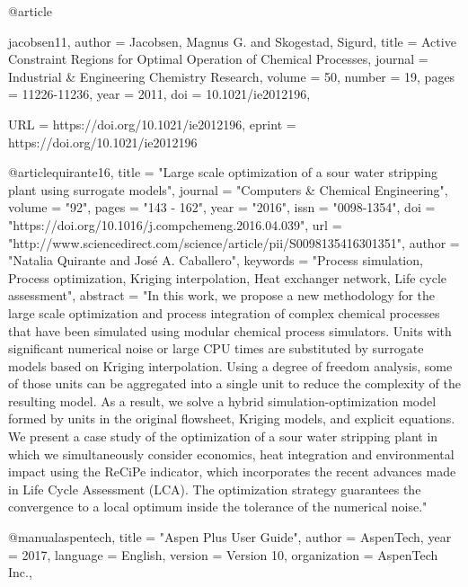 @article{jacobsen11,
author = {Jacobsen, Magnus G. and Skogestad, Sigurd},
title = {Active Constraint Regions for Optimal Operation of Chemical Processes},
journal = {Industrial \& Engineering Chemistry Research},
volume = {50},
number = {19},
pages = {11226-11236},
year = {2011},
doi = {10.1021/ie2012196},

URL = {https://doi.org/10.1021/ie2012196},
eprint = {https://doi.org/10.1021/ie2012196}
}


@article{quirante16,
title = "Large scale optimization of a sour water stripping plant using surrogate models",
journal = "Computers \& Chemical Engineering",
volume = "92",
pages = "143 - 162",
year = "2016",
issn = "0098-1354",
doi = "https://doi.org/10.1016/j.compchemeng.2016.04.039",
url = "http://www.sciencedirect.com/science/article/pii/S0098135416301351",
author = "Natalia Quirante and José A. Caballero",
keywords = "Process simulation, Process optimization, Kriging interpolation, Heat exchanger network, Life cycle assessment",
abstract = "In this work, we propose a new methodology for the large scale optimization and process integration of complex chemical processes that have been simulated using modular chemical process simulators. Units with significant numerical noise or large CPU times are substituted by surrogate models based on Kriging interpolation. Using a degree of freedom analysis, some of those units can be aggregated into a single unit to reduce the complexity of the resulting model. As a result, we solve a hybrid simulation-optimization model formed by units in the original flowsheet, Kriging models, and explicit equations. We present a case study of the optimization of a sour water stripping plant in which we simultaneously consider economics, heat integration and environmental impact using the ReCiPe indicator, which incorporates the recent advances made in Life Cycle Assessment (LCA). The optimization strategy guarantees the convergence to a local optimum inside the tolerance of the numerical noise."
}


@manual{aspentech,
title = "Aspen Plus User Guide",
author = {AspenTech},
year = {2017},
language = {English},
version = {Version 10},
organization = {AspenTech Inc.},
}


